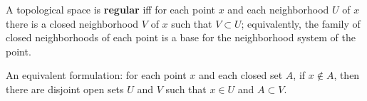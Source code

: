 A topological space is \textbf{regular} iff for each point $x$ and each neighborhood $U$ of $x$ there is a closed neighborhood $V$ of $x$ such that $V \subset U$; equivalently, the family of closed neighborhoods of each point is a base for the neighborhood system of the point.

An equivalent formulation: for each point $x$ and each closed set $A$, if $x \notin A$, then there are disjoint open sets $U$ and $V$ such that $x \in U$ and $A \subset V$.
